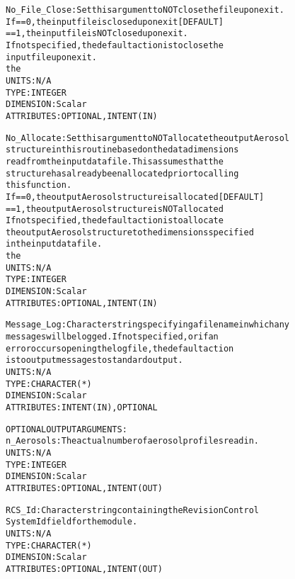 \begin{alltt}
        No_File_Close:  Set this argument to NOT close the file upon exit.
                        If == 0, the input file is closed upon exit [DEFAULT]
                           == 1, the input file is NOT closed upon exit. 
                        If not specified, the default action is to close the
                        input file upon exit.
                        the 
                        UNITS:      N/A
                        TYPE:       INTEGER
                        DIMENSION:  Scalar
                        ATTRIBUTES: OPTIONAL, INTENT(IN)
 
        No_Allocate:    Set this argument to NOT allocate the output Aerosol
                        structure in this routine based on the data dimensions
                        read from the input data file. This assumes that the
                        structure has already been allocated prior to calling 
                        this function.
                        If == 0, the output Aerosol structure is allocated [DEFAULT]
                           == 1, the output Aerosol structure is NOT allocated
                        If not specified, the default action is to allocate 
                        the output Aerosol structure to the dimensions specified
                        in the input data file.
                        the 
                        UNITS:      N/A
                        TYPE:       INTEGER
                        DIMENSION:  Scalar
                        ATTRIBUTES: OPTIONAL, INTENT(IN)
 
        Message_Log:    Character string specifying a filename in which any
                        messages will be logged. If not specified, or if an
                        error occurs opening the log file, the default action
                        is to output messages to standard output.
                        UNITS:      N/A
                        TYPE:       CHARACTER(*)
                        DIMENSION:  Scalar
                        ATTRIBUTES: INTENT(IN), OPTIONAL
 
 
  OPTIONAL OUTPUT ARGUMENTS:
        n_Aerosols:     The actual number of aerosol profiles read in.
                        UNITS:      N/A
                        TYPE:       INTEGER
                        DIMENSION:  Scalar
                        ATTRIBUTES: OPTIONAL, INTENT(OUT)
 
        RCS_Id:         Character string containing the Revision Control
                        System Id field for the module.
                        UNITS:      N/A
                        TYPE:       CHARACTER(*)
                        DIMENSION:  Scalar
                        ATTRIBUTES: OPTIONAL, INTENT(OUT)
 

\end{alltt}
